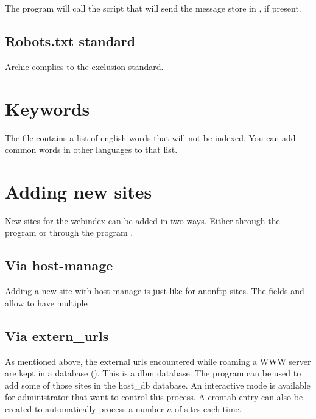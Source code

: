 The  program will call the script
 that will send the message
store in , if present. 



\subsection{Robots.txt standard} 

Archie complies to the  exclusion standard.


\section{Keywords}

The file  contains a list of english words
 that will not be indexed. You can add common words in other languages
to that list.



\section{Adding new sites}
\label{sec:addsite}

New sites for the webindex can be added in two ways. Either through
the  program or through the program .

\subsection{Via host-manage}
Adding a new site with host-manage is just like for anonftp sites.
The fields  and  allow to have multiple


\subsection{Via extern_urls}

As mentioned above, the external urls encountered while roaming a WWW server
are kept in a database (). This
is a dbm database.  The program  can be used to add some
of those sites in the host_db database. An interactive mode is available for
administrator that want to control this process. A crontab entry can also
be created to automatically process a number $n$ of sites each time.

